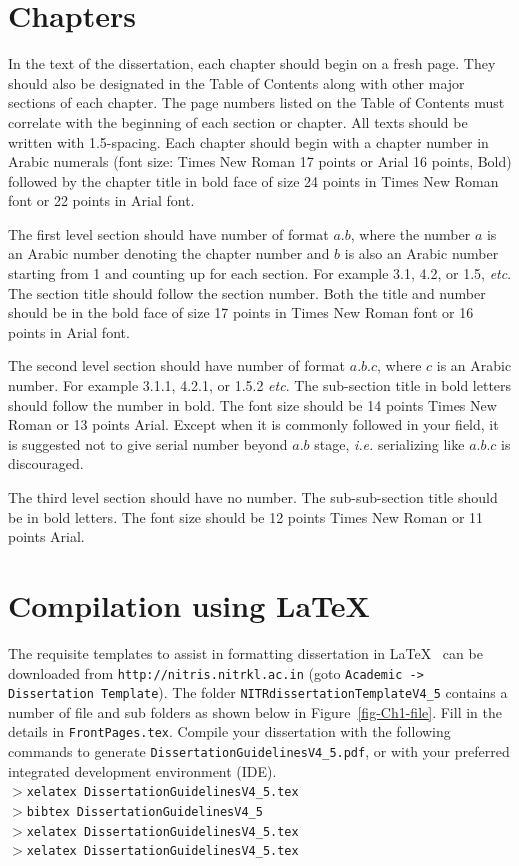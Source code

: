 \section{Chapters}
In the text of the dissertation, each chapter should begin on a fresh page. They should also be designated in the Table of Contents along with other major sections of each chapter. The page numbers listed on the Table of Contents must correlate with the beginning of each section or chapter. All texts should be written with 1.5-spacing. Each chapter should begin with a chapter number in Arabic numerals (font size: Times New Roman 17 points or Arial 16 points, Bold) followed by the chapter title in bold face of size 24 points in Times New Roman font or 22 points in Arial font. %
\par The first level section should have number of format $a.b$, where the number $a$ is an Arabic number denoting the chapter number and $b$ is also an Arabic number starting from 1 and counting up for each section. For example 3.1, 4.2, or 1.5, \textit{etc}. The section title should follow the section number. Both the title and number should be in the bold face of size 17 points in Times New Roman font or 16 points in Arial font.
\par The second level section should have number of format $a.b.c$, where $c$ is an Arabic number. For example 3.1.1, 4.2.1, or 1.5.2 \textit{etc}. The sub-section title in bold letters should follow the number in bold. The font size should be 14 points Times New Roman or 13 points Arial. Except when it is commonly followed in your field, it is suggested not to give serial number beyond $a.b$ stage, \textit{i.e.} serializing like $a.b.c$ is discouraged.
\par The third level section should have no number. The sub-sub-section title should be in bold letters. The font size should be 12 points Times New Roman or 11 points Arial.
\section{Compilation using \LaTeX}
The requisite templates to assist in formatting dissertation in \LaTeX~ can be downloaded from \texttt{http://nitris.nitrkl.ac.in} (goto \texttt{Academic -> Dissertation Template}). The folder \texttt{NITRdissertationTemplateV4\_5} contains a number of file and sub folders as shown below in Figure~\ref{fig-Ch1-file}. Fill in the details in \texttt{FrontPages.tex}. Compile your dissertation with the following commands to generate \texttt{DissertationGuidelinesV4\_5.pdf}, or with your preferred integrated development environment (IDE).\\
$>$\texttt{xelatex DissertationGuidelinesV4\_5.tex}\\
$>$\texttt{bibtex DissertationGuidelinesV4\_5}\\
$>$\texttt{xelatex DissertationGuidelinesV4\_5.tex}\\
$>$\texttt{xelatex DissertationGuidelinesV4\_5.tex}\\

